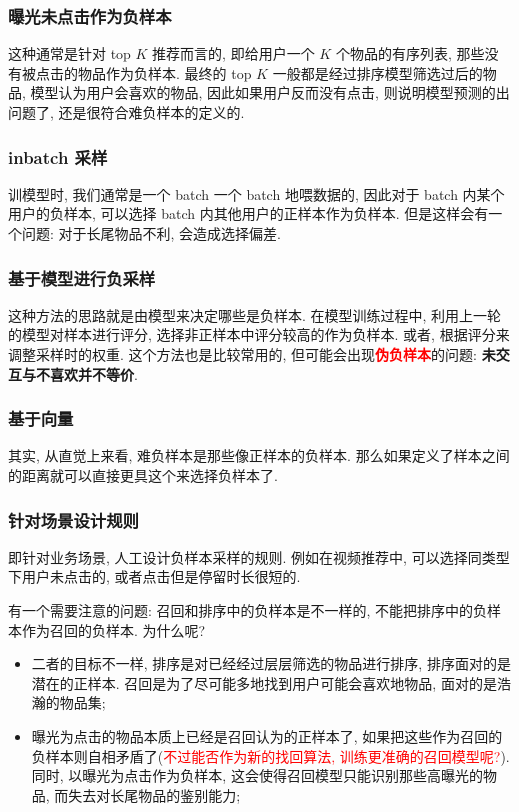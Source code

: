 \subsubsection{曝光未点击作为负样本}
这种通常是针对 top $K$ 推荐而言的, 即给用户一个 $K$ 个物品的有序列表, 那些没有被点击的物品作为负样本. 最终的 top $K$ 一般都是经过排序模型筛选过后的物品, 模型认为用户会喜欢的物品, 因此如果用户反而没有点击, 则说明模型预测的出问题了, 还是很符合难负样本的定义的. 

\subsubsection{inbatch 采样}
训模型时, 我们通常是一个 batch 一个 batch 地喂数据的, 因此对于 batch 内某个用户的负样本, 可以选择 batch 内其他用户的正样本作为负样本. 但是这样会有一个问题: 对于长尾物品不利, 会造成选择偏差.

\subsubsection{基于模型进行负采样}
这种方法的思路就是由模型来决定哪些是负样本. 在模型训练过程中, 利用上一轮的模型对样本进行评分, 选择非正样本中评分较高的作为负样本. 或者, 根据评分来调整采样时的权重. 这个方法也是比较常用的, 但可能会出现\textcolor{red}{\textbf{伪负样本}}的问题: \textbf{未交互与不喜欢并不等价}.

\subsubsection{基于向量}
其实, 从直觉上来看, 难负样本是那些像正样本的负样本. 那么如果定义了样本之间的距离就可以直接更具这个来选择负样本了.

\subsubsection{针对场景设计规则}
即针对业务场景, 人工设计负样本采样的规则. 例如在视频推荐中, 可以选择同类型下用户未点击的, 或者点击但是停留时长很短的.

有一个需要注意的问题: 召回和排序中的负样本是不一样的, 不能把排序中的负样本作为召回的负样本. 为什么呢?
\begin{itemize}
	\item 二者的目标不一样, 排序是对已经经过层层筛选的物品进行排序, 排序面对的是潜在的正样本. 召回是为了尽可能多地找到用户可能会喜欢地物品, 面对的是浩瀚的物品集;
	
	\item 曝光为点击的物品本质上已经是召回认为的正样本了, 如果把这些作为召回的负样本则自相矛盾了(\textcolor{red}{不过能否作为新的找回算法, 训练更准确的召回模型呢?}). 同时, 以曝光为点击作为负样本, 这会使得召回模型只能识别那些高曝光的物品, 而失去对长尾物品的鉴别能力;
	
\end{itemize}

